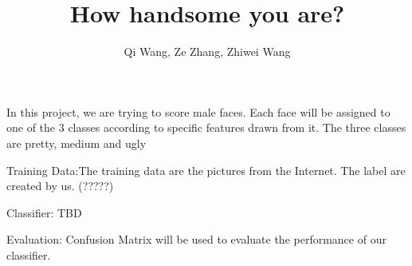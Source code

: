 \documentclass{article}
\title{How handsome you are?}
\author{Qi Wang, Ze Zhang, Zhiwei Wang}
\begin{document}
	\maketitle
	In this project, we are trying to score male faces. Each face will be assigned to one of the 3 classes according to specific features drawn from it. The three classes are pretty, medium and ugly \par

	Training Data:The training data are the pictures from the Internet. The label are created by us. (?????) \par
	
	Classifier: TBD\par
	
	Evaluation: Confusion Matrix will be used to evaluate the performance of our classifier.\par
	
\end{document}
